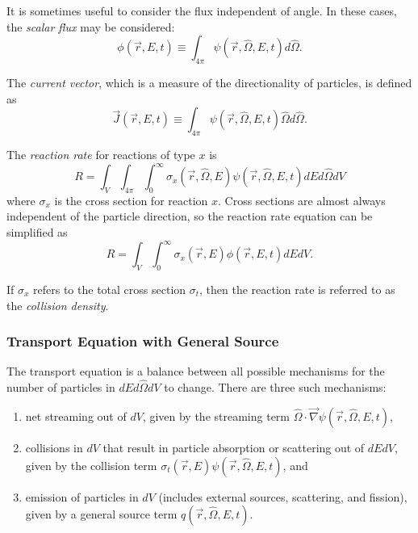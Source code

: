 It is sometimes useful to consider the flux independent of angle.
In these cases, the \textit{scalar flux} may be considered:
\begin{equation}\label{eq:bg:rt:scalar-flux}
  \phi\left(\vec{r},E,t\right) \equiv \int_{4\pi}\psi\left(\vec{r},\hat{\Omega},E,t\right)d\hat{\Omega}.
\end{equation}

The \textit{current vector}, which is a measure of the directionality of particles, is defined as
\begin{equation}\label{eq:bg:rt:current-vector}
  \vec{J}\left(\vec{r},E,t\right) \equiv \int_{4\pi}\psi\left(\vec{r},\hat{\Omega},E,t\right)\hat{\Omega} d\hat{\Omega}.
\end{equation}

The \textit{reaction rate} for reactions of type $x$ is
\begin{equation}\label{eq:bg:rt:rxn-rate-angular}
  R = \int_V\int_{4\pi}\int_0^\infty\sigma_x\left(\vec{r},\hat{\Omega},E\right)\psi\left(\vec{r},\hat{\Omega},E,t\right)dEd\hat{\Omega}dV
\end{equation}
where $\sigma_x$ is the cross section for reaction $x$.
Cross sections are almost always independent of the particle direction, so the reaction rate equation can be simplified as
\begin{equation}\label{eq:bg:rt:rxn-rate-scalar}
  R = \int_V\int_0^\infty\sigma_x\left(\vec{r},E\right)\phi\left(\vec{r},E,t\right)dEdV.
\end{equation}

If $\sigma_x$ refers to the total cross section $\sigma_t$, then the reaction rate is referred to as the \textit{collision density}.

\subsubsection{Transport Equation with General Source}
\label{sec:bg:rt:te:te}

The transport equation is a balance between all possible mechanisms for the number of particles in $dEd\hat{\Omega}dV$ to change.
There are three such mechanisms:
\begin{enumerate}
  \item net streaming out of $dV$, given by the streaming term $\hat{\Omega}\cdot\vec{\nabla}\psi\left(\vec{r},\hat{\Omega},E,t\right)$,
  \item collisions in $dV$ that result in particle absorption or scattering out of $dEdV$, given by the collision term $\sigma_t\left(\vec{r},E\right)\psi\left(\vec{r},\hat{\Omega},E,t\right)$, and
  \item emission of particles in $dV$ (includes external sources, scattering, and fission), given by a general source term $q\left(\vec{r},\hat{\Omega},E,t\right)$.
\end{enumerate}


